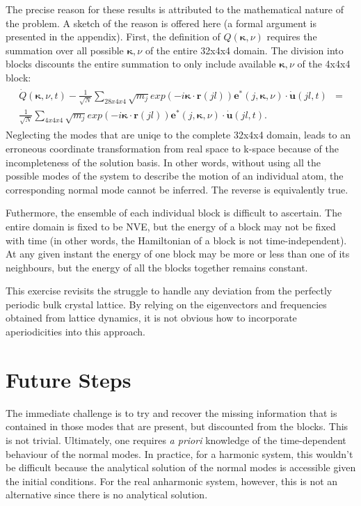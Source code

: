 \documentclass[aps,prb,preprint,preprintnumbers,amsmath,amssymb,floatfix,superscriptaddress]{revtex4}
\begin{document}
The precise reason for these results is attributed to the mathematical nature of the problem. A sketch of the reason is offered here (a formal argument is presented in the appendix). First, the definition of $Q(\pmb{\kappa},\nu)$ requires the summation over all possible $\pmb{\kappa},\nu$ of the entire 32x4x4 domain. The division into blocks discounts the entire summation to only include available $\pmb{\kappa},\nu$ of the 4x4x4 block:
\begin{eqnarray}
\begin{split}
\dot{Q}(\pmb{\kappa},\nu,t)-\frac{1}{\sqrt{N}}\sum_{28x4x4}\sqrt{m_j}exp(-i\pmb{\kappa}\cdot\pmb{r}(jl))\pmb{e}^*(j,\pmb{\kappa},\nu)\cdot\dot{\pmb{u}}(jl,t)&=\\\frac{1}{\sqrt{N}}\sum_{4x4x4}\sqrt{m_j}exp(-i\pmb{\kappa}\cdot\pmb{r}(jl))\pmb{e}^*(j,\pmb{\kappa},\nu)\cdot\dot{\pmb{u}}(jl,t).
\end{split}
\end{eqnarray}
Neglecting the modes that are uniqe to the complete 32x4x4 domain, leads to an erroneous coordinate transformation from real space to k-space because of the incompleteness of the solution basis. In other words, without using all the possible modes of the system to describe the motion of an individual atom, the corresponding normal mode cannot be inferred. The reverse is equivalently true.

Futhermore, the ensemble of each individual block is difficult to ascertain. The entire domain is fixed to be NVE, but the energy of a block may not be fixed with time (in other words, the Hamiltonian of a block is not time-independent). At any given instant the energy of one block may be more or less than one of its neighbours, but the energy of all the blocks together remains constant.

This exercise revisits the struggle to handle any deviation from the perfectly periodic bulk crystal lattice. By relying on the eigenvectors and frequencies obtained from lattice dynamics, it is not obvious how to incorporate aperiodicities into this approach.

\section*{Future Steps}

The immediate challenge is to try and recover the missing information that is contained in those modes that are present, but discounted from the blocks. This is not trivial. Ultimately, one requires \textit{a priori} knowledge of the time-dependent behaviour of the normal modes. In practice, for a harmonic system, this wouldn't be difficult because the analytical solution of the normal modes is accessible given the initial conditions. For the real anharmonic system, however, this is not an alternative since there is no analytical solution.
\end{document}
